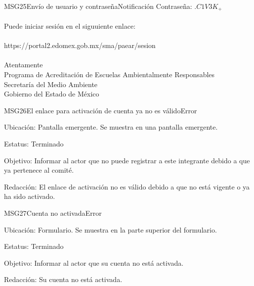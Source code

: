 \begin{mensaje}{MSG25}{Envío de usuario y contraseña}{Notificación}
	  Contraseña: {\em $.C1V3K_+$}\\ \\
	  Puede iniciar sesión en el siguuiente enlace:\\ \\
	  https://portal2.edomex.gob.mx/sma/paear/sesion \\ \\
	  Atentamente\\
	  Programa de Acreditación de Escuelas Ambientalmente Responsables\\
	  Secretaría del Medio Ambiente\\
	  Gobierno del Estado de México\\
\end{mensaje}
\begin{mensaje}{MSG26}{El enlace para activación de cuenta ya no es válido}{Error}
    \item[Ubicación:] Pantalla emergente. Se muestra en una pantalla emergente.
    \item[Estatus:] Terminado
    \item[Objetivo:] Informar al actor que no puede registrar a este integrante debido a que ya pertenece al comité.
    \item[Redacción:] El enlace de activación no es válido debido a que no está vigente o ya ha sido activado.
\end{mensaje}
\begin{mensaje}{MSG27}{Cuenta no activada}{Error}
    \item[Ubicación:] Formulario. Se muestra en la parte superior del formulario.
    \item[Estatus:] Terminado
    \item[Objetivo:] Informar al actor que su cuenta no está activada.
    \item[Redacción:] Su cuenta no está activada.
\end{mensaje}


